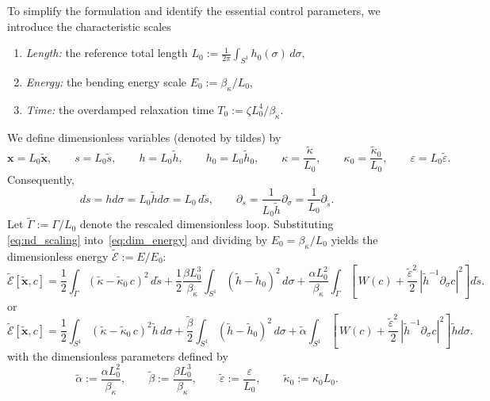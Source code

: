 \documentclass[
aip,
jcp,
reprint, 
floatfix
]{revtex4-1}
\begin{document}
To simplify the formulation and identify the essential control parameters, we introduce the
characteristic scales
\begin{enumerate}
    \item \emph{Length:} the reference total length
$L_0 := \frac{1}{2\pi}\int_{S^1} h_0(\sigma)\,d\sigma, $
    \item \emph{Energy:} the bending energy scale
    $E_0 := {\beta_{\kappa}}/{L_0},$
    \item \emph{Time:} the overdamped relaxation time 
    $T_0 := {\zeta L_0^4}/{\beta_{\kappa}}.$
\end{enumerate} 
We define dimensionless variables (denoted by tildes) by
\begin{equation}
\mathbf{x}=L_0\tilde{\mathbf{x}},\qquad
s=L_0\tilde{s},\qquad
h=L_0\tilde{h},\qquad
h_0=L_0\tilde{h}_0,\qquad
\kappa=\frac{\tilde{\kappa}}{L_0},\qquad
\kappa_0=\frac{\tilde{\kappa}_0}{L_0},\qquad
\varepsilon=L_0\tilde{\varepsilon}.
\label{eq:nd_scaling}
\end{equation}
Consequently,
\[
ds =hd\sigma=L_0\tilde{h}d\sigma= L_0\,d\tilde{s},\qquad
\partial_s = \frac{1}{L_0 \tilde{h}}\partial_{\sigma}=\frac{1}{L_0}\partial_{\tilde{s}}.
\]
Let $\tilde{\Gamma}:=\Gamma/L_0$ denote the rescaled dimensionless loop. Substituting
\eqref{eq:nd_scaling} into~\eqref{eq:dim_energy} and dividing by $E_0=\beta_{\kappa}/L_0$ yields the
dimensionless energy $\tilde{\mathcal{E}}:=E/E_0$:
\begin{equation}
\tilde{\mathcal{E}}[\tilde{\mathbf{x}},c]
=
\frac{1}{2}\int_{\tilde{\Gamma}} (\tilde{\kappa}-\tilde{\kappa}_0\,c)^2\,d\tilde{s}
+\frac{1}{2}\frac{\beta L_0^3}{\beta_{\kappa}}\int_{S^1} (\tilde{h}-\tilde{h}_0)^2\,d\sigma
+\frac{\alpha L_0^2}{\beta_{\kappa}}\int_{\tilde{\Gamma}}
\left[\, W(c) + \frac{\tilde{\varepsilon}^2}{2}\,|\tilde{h}^{-1}\partial_{\sigma} c|^2 \right] d\tilde{s}.
\label{eq:nd_energy_full}
\end{equation}
or 
\begin{equation}
\tilde{\mathcal{E}}[\tilde{\mathbf{x}},c]
=\frac{1}{2}\int_{S^1} (\tilde{\kappa}-\tilde{\kappa}_0\,c)^2\tilde{h}\,d\sigma
+\frac{\tilde{\beta}}{2}\int_{S^1} (\tilde{h}-\tilde{h}_0)^2\,d\sigma
+\tilde{\alpha}\int_{S^1}
\left[\, W(c) + \frac{\tilde{\varepsilon}^2}{2}\,|\tilde{h}^{-1}\partial_{\sigma} c|^2 \right] \tilde{h}d\sigma.
\label{eq:nd_energy}
\end{equation}
with the dimensionless parameters defined by
\begin{equation}
\tilde{\alpha} := \frac{\alpha L_0^2}{\beta_{\kappa}},\qquad
\tilde{\beta} := \frac{\beta L_0^3}{\beta_{\kappa}},\qquad
\tilde{\varepsilon} := \frac{\varepsilon}{L_0},\qquad
\tilde{\kappa}_0 := \kappa_0 L_0.
\label{eq:nd_params}
\end{equation}
\end{document}
